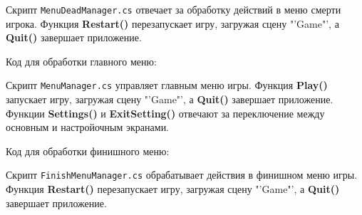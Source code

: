 Скрипт \texttt{MenuDeadManager.cs} отвечает за обработку действий
в меню смерти игрока. Функция \textbf{Restart()} перезапускает игру,
загружая сцену "'Game"', а \textbf{Quit()} завершает приложение.

Код для обработки главного меню:                                               


Скрипт \texttt{MenuManager.cs} управляет главным меню игры.
Функция \textbf{Play()} запускает игру, загружая сцену "'Game"',
а \textbf{Quit()} завершает приложение.
Функции \textbf{Settings()} и \textbf{ExitSetting()} отвечают
за переключение между основным и настройочным экранами.

Код для обработки финишного меню:                                              


Скрипт \texttt{FinishMenuManager.cs} обрабатывает действия
в финишном меню игры. Функция \textbf{Restart()} перезапускает игру,
загружая сцену "'Game"', а \textbf{Quit()} завершает приложение.

